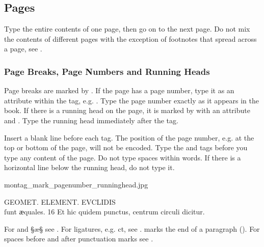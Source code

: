 \tocspace
\subsection{Pages}

\begin{mainrule}
Type the entire contents of one page, then go on to the next page. Do not mix the contents of different pages with the exception of footnotes that spread across a page, see .
\end{mainrule}

\subsubsection{Page Breaks, Page Numbers and Running Heads}
\label{section page breaks}

\begin{mainrule}
Page breaks are marked by . If the page has a page number, type it as an attribute  within the  tag, e.g. . Type the page number exactly as it appears in the book. If there is a running head on the page, it is marked by  with an attribute  and . Type the running head immediately after the  tag.
\end{mainrule}

\begin{clarification}
Insert a blank line before each  tag.
The position of the page number, e.g. at the top or bottom of the page, will not be encoded. Type the  and  tags before you type any content of the page. Do not type spaces within words. If there is a horizontal line below the running head, do not type it.
\end{clarification}

\begin{sampleImage}{montag_mark_pagenumber_runninghead.jpg}

\begin{typeLatin}
GEOMET. ELEMENT. EVCLIDIS \\
ſunt ӕquales. 16 Et hic quidem punctus, centrum circuli dicitur. \\
\untranscribedText
\end{typeLatin}
\end{sampleImage}

\begin{crossref}
For and §æ§ see . For ligatures, e.g. { ct}, see .  marks the end of a paragraph (). For spaces before and after punctuation marks see .
\end{crossref}

